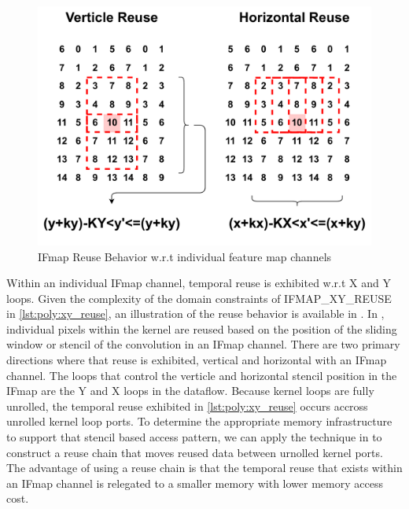 \begin{figure}[]
    \centering
    \includegraphics[scale=0.4]{fig/xy_reuse.pdf}
    \caption{IFmap Reuse Behavior w.r.t individual feature map channels}
    \label{fig:ifmap_xy_reuse}
\end{figure}

Within an individual IFmap channel, temporal reuse is exhibited w.r.t X and Y
loops. Given the complexity of the domain constraints of IFMAP\_XY\_REUSE in
\autoref{lst:poly:xy_reuse}, an illustration of the reuse behavior is available
in . In , individual
pixels within the kernel are reused based on the position of the sliding window
or stencil of the convolution in an IFmap channel. There are two primary
directions where that reuse is exhibited, vertical and horizontal with an IFmap
channel. The loops that control the verticle and horizontal stencil position in
the IFmap are the Y and X loops in the dataflow. Because kernel loops are fully
unrolled, the temporal reuse exhibited in \autoref{lst:poly:xy_reuse} occurs
accross unrolled kernel loop ports. To determine the appropriate memory
infrastructure to support that stencil based access pattern, we can apply the
technique in \cite{meeus} to construct a reuse chain that moves reused data
between urnolled kernel ports. The advantage of using a reuse chain is that the
temporal reuse that exists within an IFmap channel is relegated to a smaller
memory with lower memory access cost.

